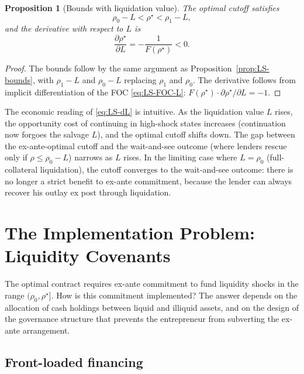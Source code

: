 \documentclass[11pt,a4paper,oneside]{book}
\def\leq{\leqslant}
\theoremstyle{plain}
\newtheorem{proposition}[theorem]{Proposition}
\theoremstyle{definition}
\theoremstyle{remark}
\numberwithin{equation}{chapter}
\begin{document}
\begin{proposition}[Bounds with liquidation value]\label{prop:LS-bounds-L}
The optimal cutoff satisfies
\begin{equation*}
  \rho_0 - L < \rho^\star < \rho_1 - L,
\end{equation*}
and the derivative with respect to $L$ is
\begin{equation}\label{eq:LS-dL}
  \frac{\partial \rho^\star}{\partial L} = -\frac{1}{F(\rho^\star)} < 0.
\end{equation}
\end{proposition}

\begin{proof}
The bounds follow by the same argument as Proposition~\ref{prop:LS-bounds}, with $\rho_1 - L$ and $\rho_0 - L$ replacing $\rho_1$ and $\rho_0$.
The derivative follows from implicit differentiation of the FOC \eqref{eq:LS-FOC-L}: $F(\rho^\star) \cdot \partial \rho^\star / \partial L = -1$.
\end{proof}

The economic reading of \eqref{eq:LS-dL} is intuitive.
As the liquidation value $L$ rises, the opportunity cost of continuing in high-shock states increases (continuation now forgoes the salvage $L$), and the optimal cutoff shifts down.
The gap between the ex-ante-optimal cutoff and the wait-and-see outcome (where lenders rescue only if $\rho \leq \rho_0 - L$) narrows as $L$ rises.
In the limiting case where $L = \rho_0$ (full-collateral liquidation), the cutoff converges to the wait-and-see outcome: there is no longer a strict benefit to ex-ante commitment, because the lender can always recover his outlay ex post through liquidation.

\section{The Implementation Problem: Liquidity Covenants}
\label{sec:LS-covenants}

The optimal contract requires ex-ante commitment to fund liquidity shocks in the range $(\rho_0, \rho^\star]$.
How is this commitment implemented?
The answer depends on the allocation of cash holdings between liquid and illiquid assets, and on the design of the governance structure that prevents the entrepreneur from subverting the ex-ante arrangement.

\subsection{Front-loaded financing}
\end{document}
